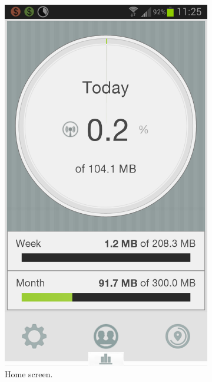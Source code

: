\begin{figure}
\centering
\begin{subfigure}[b]{0.23\textwidth}
	\includegraphics[width = \textwidth]{Figures/Main.png}
	\caption{Home screen.}
	\label{fig:datawiz_main}
	\end{subfigure}
	\begin{subfigure}[b]{0.23\textwidth}

\end{subfigure}
\end{figure}
